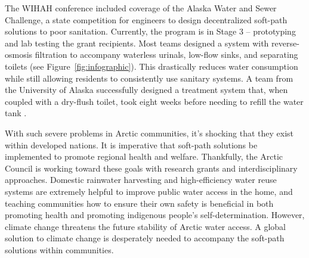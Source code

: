 \documentclass[american]{../../../coursework}
\begin{document}
The WIHAH conference included coverage of the Alaska Water and Sewer
Challenge, a state competition for engineers to design decentralized soft-path
solutions to poor sanitation. Currently, the program is in Stage 3 --
prototyping and lab testing the grant recipients. Most teams designed a system
with reverse-osmosis filtration to accompany waterless urinals, low-flow
sinks, and separating toilets (see Figure~\ref{fig:infographic}). This
drastically reduces water consumption while still allowing residents to
consistently use sanitary systems. A team from the University of Alaska
successfully designed a treatment system that, when coupled with a dry-flush
toilet, took eight weeks before needing to refill the water tank
\parencite{Dotson2016}.

With such severe problems in Arctic communities, it's shocking that they exist
within developed nations. It is imperative that soft-path solutions be
implemented to promote regional health and welfare. Thankfully, the Arctic
Council is working toward these goals with research grants and
interdisciplinary approaches. Domestic rainwater harvesting and
high-efficiency water reuse systems are extremely helpful to improve public
water access in the home, and teaching communities how to ensure their own
safety is beneficial in both promoting health and promoting indigenous
people's self-determination. However, climate change threatens the future
stability of Arctic water access. A global solution to climate change is
desperately needed to accompany the soft-path solutions within communities.

\printbibliography
\end{document}
